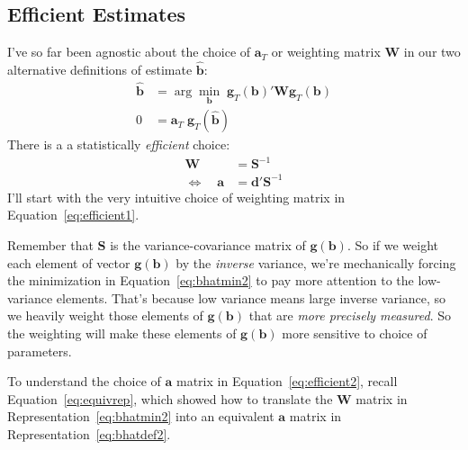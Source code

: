 \documentclass[12pt]{article}
\theoremstyle{plain}
\theoremstyle{definition}
\theoremstyle{remark}
\begin{document}
\clearpage
\subsection{Efficient Estimates}

I've so far been agnostic about the choice of $\boldsymbol{a}_T$ or
weighting matrix $\boldsymbol{W}$ in our two alternative definitions of
estimate $\boldsymbol{\hat{b}}$:
\begin{align}
  \boldsymbol{\hat{b}} &= \arg\min_{\boldsymbol{b}}\;
  \boldsymbol{g}_T(\boldsymbol{b})' \boldsymbol{W}
  \boldsymbol{g}_T(\boldsymbol{b})
  \label{eq:bhatmin2}\\
  0 &= \boldsymbol{a}_T
    \;
    \boldsymbol{g}_T(\boldsymbol{\hat{b}})
  \label{eq:bhatdef2}
\end{align}
There is a a statistically \emph{efficient} choice:
\begin{align}
  \boldsymbol{W} &= \boldsymbol{S}^{-1} \label{eq:efficient1}\\
  \Leftrightarrow \quad
  \boldsymbol{a} &= \boldsymbol{d}' \boldsymbol{S}^{-1}
  \label{eq:efficient2}
\end{align}
I'll start with the very intuitive choice of weighting matrix in
Equation~\ref{eq:efficient1}.

Remember that $\boldsymbol{S}$ is the variance-covariance matrix of
$\boldsymbol{g}(\boldsymbol{b})$. So if we weight each element of vector
$\boldsymbol{g}(\boldsymbol{b})$ by the \emph{inverse} variance, we're
mechanically forcing the minimization in Equation~\ref{eq:bhatmin2} to
pay more attention to the low-variance elements. That's because low
variance means large inverse variance, so we heavily weight those
elements of $\boldsymbol{g}(\boldsymbol{b})$ that are \emph{more
precisely measured}. So the weighting will make these elements of
$\boldsymbol{g}(\boldsymbol{b})$ more sensitive to choice of parameters.

To understand the choice of $\boldsymbol{a}$ matrix in
Equation~\ref{eq:efficient2}, recall Equation~\ref{eq:equivrep}, which
showed how to translate the $\boldsymbol{W}$ matrix in
Representation~\ref{eq:bhatmin2} into an equivalent $\boldsymbol{a}$
matrix in Representation~\ref{eq:bhatdef2}.
\end{document}
